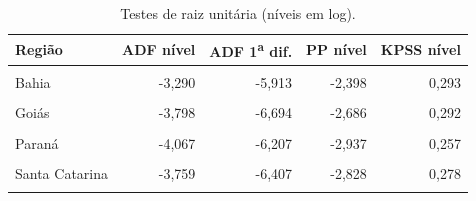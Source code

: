 \begin{table}[!h]
\centering
\caption{\label{tab:raiz}Testes de raiz unitária (níveis em log).}
\centering
\fontsize{10}{12}\selectfont
\begin{tabular}[t]{lrrrr}
\toprule
\textbf{Região} & \textbf{ADF nível} & \textbf{ADF 1\textsuperscript{a} dif.} & \textbf{PP nível} & \textbf{KPSS nível}\\
\midrule
\cellcolor{gray!10}{Média Brasil} & \cellcolor{gray!10}{-3,968} & \cellcolor{gray!10}{-6,378} & \cellcolor{gray!10}{-2,746} & \cellcolor{gray!10}{0,276}\\
Bahia & -3,290 & -5,913 & -2,398 & 0,293\\
\cellcolor{gray!10}{Espírito Santo} & \cellcolor{gray!10}{-3,506} & \cellcolor{gray!10}{-5,994} & \cellcolor{gray!10}{-2,651} & \cellcolor{gray!10}{0,227}\\
Goiás & -3,798 & -6,694 & -2,686 & 0,292\\
\cellcolor{gray!10}{Minas Gerais} & \cellcolor{gray!10}{-4,116} & \cellcolor{gray!10}{-6,385} & \cellcolor{gray!10}{-2,833} & \cellcolor{gray!10}{0,253}\\
Paraná & -4,067 & -6,207 & -2,937 & 0,257\\
\cellcolor{gray!10}{Rio de Janeiro} & \cellcolor{gray!10}{-2,837} & \cellcolor{gray!10}{-5,425} & \cellcolor{gray!10}{-2,494} & \cellcolor{gray!10}{0,331}\\
Santa Catarina & -3,759 & -6,407 & -2,828 & 0,278\\
\cellcolor{gray!10}{São Paulo} & \cellcolor{gray!10}{-4,062} & \cellcolor{gray!10}{-6,223} & \cellcolor{gray!10}{-2,639} & \cellcolor{gray!10}{0,290}\\
\bottomrule
\end{tabular}
\end{table}
